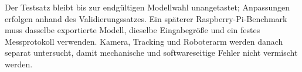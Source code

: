 Der Testsatz bleibt bis zur endgültigen Modellwahl unangetastet; Anpassungen erfolgen anhand des Validierungssatzes. Ein späterer Raspberry-Pi-Benchmark muss dasselbe exportierte Modell, dieselbe Eingabegröße und ein festes Messprotokoll verwenden. Kamera, Tracking und Roboterarm werden danach separat untersucht, damit mechanische und softwareseitige Fehler nicht vermischt werden.
